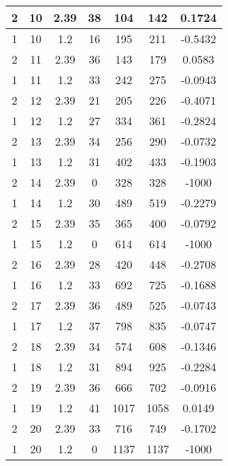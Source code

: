 \documentclass[letterpaper, 12pt]{article}
\begin{document}
\begin{longtable}{|c|c|c|c|c|c|c|}
\hline
2 & 10 & 2.39 & 38 & 104 & 142 & 0.1724 \\
\hline
1 & 10 & 1.2 & 16 & 195 & 211 & -0.5432 \\
\hline
2 & 11 & 2.39 & 36 & 143 & 179 & 0.0583 \\
\hline
1 & 11 & 1.2 & 33 & 242 & 275 & -0.0943 \\
\hline
2 & 12 & 2.39 & 21 & 205 & 226 & -0.4071 \\
\hline
1 & 12 & 1.2 & 27 & 334 & 361 & -0.2824 \\
\hline
2 & 13 & 2.39 & 34 & 256 & 290 & -0.0732 \\
\hline
1 & 13 & 1.2 & 31 & 402 & 433 & -0.1903 \\
\hline
2 & 14 & 2.39 & 0 & 328 & 328 & -1000 \\
\hline
1 & 14 & 1.2 & 30 & 489 & 519 & -0.2279 \\
\hline
2 & 15 & 2.39 & 35 & 365 & 400 & -0.0792 \\
\hline
1 & 15 & 1.2 & 0 & 614 & 614 & -1000 \\
\hline
2 & 16 & 2.39 & 28 & 420 & 448 & -0.2708 \\
\hline
1 & 16 & 1.2 & 33 & 692 & 725 & -0.1688 \\
\hline
2 & 17 & 2.39 & 36 & 489 & 525 & -0.0743 \\
\hline
1 & 17 & 1.2 & 37 & 798 & 835 & -0.0747 \\
\hline
2 & 18 & 2.39 & 34 & 574 & 608 & -0.1346 \\
\hline
1 & 18 & 1.2 & 31 & 894 & 925 & -0.2284 \\
\hline
2 & 19 & 2.39 & 36 & 666 & 702 & -0.0916 \\
\hline
1 & 19 & 1.2 & 41 & 1017 & 1058 & 0.0149 \\
\hline
2 & 20 & 2.39 & 33 & 716 & 749 & -0.1702 \\
\hline
1 & 20 & 1.2 & 0 & 1137 & 1137 & -1000 \\
\hline
\end{longtable}
\end{document}
